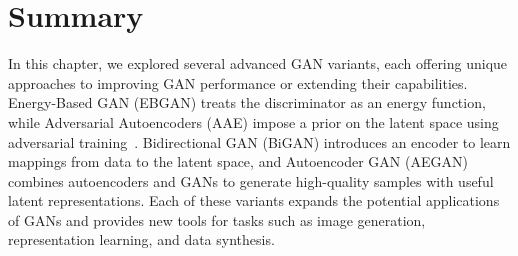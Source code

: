 \section{Summary}
In this chapter, we explored several advanced GAN variants, each offering unique approaches to improving GAN performance or extending their capabilities. Energy-Based GAN (EBGAN) treats the discriminator as an energy function, while Adversarial Autoencoders (AAE) impose a prior on the latent space using adversarial training~\cite{xu2019cross}. Bidirectional GAN (BiGAN) introduces an encoder to learn mappings from data to the latent space, and Autoencoder GAN (AEGAN) combines autoencoders and GANs to generate high-quality samples with useful latent representations. Each of these variants expands the potential applications of GANs and provides new tools for tasks such as image generation, representation learning, and data synthesis.
